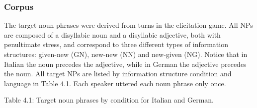\subsubsection{Corpus}
\hypertarget{Toc191305893}{}\begin{styleStandard}
The target noun phrases were derived from turns in the elicitation game. All NPs are composed of a disyllabic noun and a disyllabic adjective, both with penultimate stress, and correspond to three different types of information structures: given-new (GN), new-new (NN) and new-given (NG). Notice that in Italian the noun precedes the adjective, while in German the adjective precedes the noun. All target NPs are listed by information structure condition and language in Table 4.1. Each speaker uttered each noun phrase only once.
\end{styleStandard}

\begin{stylelsTableHeading}
Table 4.1: Target noun phrases by condition for Italian and German.
\end{stylelsTableHeading}

